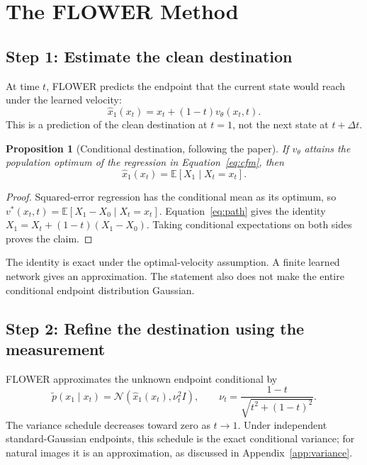 \documentclass[10pt,letterpaper]{article}
\newcommand{\E}{\mathbb{E}}
\newcommand{\N}{\mathcal{N}}
\newcommand{\xhat}{\widehat{x}_1}
\newtheorem{proposition}{Proposition}
\begin{document}
\section{The FLOWER Method}
\subsection{Step 1: Estimate the clean destination}
At time $t$, FLOWER predicts the endpoint that the current state would reach under the learned velocity:
\begin{equation}
 \xhat(x_t)=x_t+(1-t)v_\theta(x_t,t).
 \label{eq:destination}
\end{equation}
This is a prediction of the clean destination at $t=1$, not the next state at $t+\Delta t$.

\begin{proposition}[Conditional destination, following the paper]
If $v_\theta$ attains the population optimum of the regression in Equation~\eqref{eq:cfm}, then
\begin{equation}
 \xhat(x_t)=\E[X_1\mid X_t=x_t].
\end{equation}
\end{proposition}
\begin{proof}
Squared-error regression has the conditional mean as its optimum, so $v^*(x_t,t)=\E[X_1-X_0\mid X_t=x_t]$. Equation~\eqref{eq:path} gives the identity $X_1=X_t+(1-t)(X_1-X_0)$. Taking conditional expectations on both sides proves the claim.
\end{proof}
The identity is exact under the optimal-velocity assumption. A finite learned network gives an approximation. The statement also does not make the entire conditional endpoint distribution Gaussian.

\subsection{Step 2: Refine the destination using the measurement}
FLOWER approximates the unknown endpoint conditional by
\begin{equation}
 \widetilde p(x_1\mid x_t)=\N(\xhat(x_t),\nu_t^2 I),
 \qquad \nu_t=\frac{1-t}{\sqrt{t^2+(1-t)^2}}.
 \label{eq:gaussian}
\end{equation}
The variance schedule decreases toward zero as $t\to1$. Under independent standard-Gaussian endpoints, this schedule is the exact conditional variance; for natural images it is an approximation, as discussed in Appendix~\ref{app:variance}.
\end{document}

